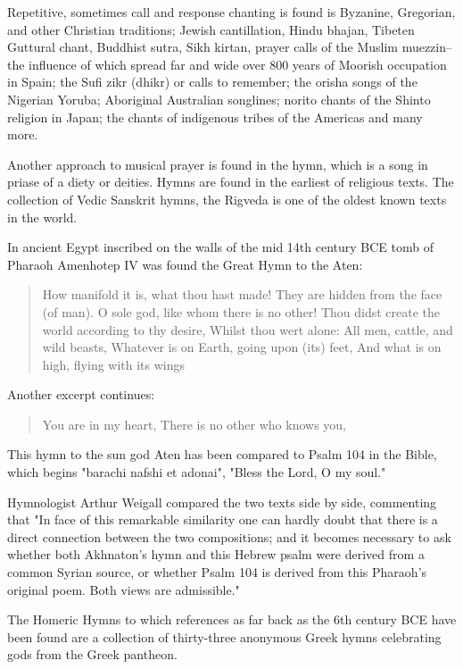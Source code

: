 \documentclass[12pt]{article}
\begin{document}
Repetitive, sometimes call and response chanting is found is Byzanine, Gregorian, and other Christian traditions; Jewish cantillation, Hindu bhajan, Tibeten Guttural chant, Buddhist sutra, Sikh kirtan, prayer calls of the Muslim muezzin–the influence of which spread far and wide over 800 years of Moorish occupation in Spain; the Sufi zikr (dhikr) or calls to remember; the orisha songs of the Nigerian Yoruba; Aboriginal Australian songlines; norito chants of the Shinto religion in Japan; the chants of indigenous tribes of the Americas and many more.

Another approach to musical prayer is found in the hymn, which is a song in priase of a diety or deities. Hymns are found in the earliest of religious texts. The collection of Vedic Sanskrit hymns, the Rigveda is one of the oldest known texts in the world.

In ancient Egypt inscribed on the walls of the mid 14th century BCE tomb of Pharaoh Amenhotep IV was found the Great Hymn to the Aten:

\begin{quote}
How manifold it is, what thou hast made!
They are hidden from the face (of man).
O sole god, like whom there is no other!
Thou didst create the world according to thy desire,
Whilst thou wert alone: All men, cattle, and wild beasts,
Whatever is on Earth, going upon (its) feet,
And what is on high, flying with its wings
\end{quote}

Another excerpt continues:

\begin{quote}
You are in my heart,
There is no other who knows you,
\end{quote}

This hymn to the sun god Aten has been compared to Psalm 104 in the Bible, which begins "barachi nafshi et adonai", "Bless the Lord, O my soul."

Hymnologist Arthur Weigall compared the two texts side by side, commenting that "In face of this remarkable similarity one can hardly doubt that there is a direct connection between the two compositions; and it becomes necessary to ask whether both Akhnaton's hymn and this Hebrew psalm were derived from a common Syrian source, or whether Psalm 104 is derived from this Pharaoh's original poem. Both views are admissible."

The Homeric Hymns to which references as far back as the 6th century BCE have been found are a collection of thirty-three anonymous Greek hymns celebrating gods from the Greek pantheon.
\end{document}
